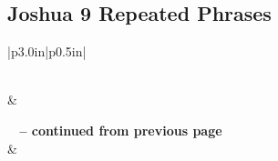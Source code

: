 \subsection{Joshua 9 Repeated Phrases}


\normalsize
 
\begin{center}
\begin{longtable}{|p{3.0in}|p{0.5in}|}
\caption[Joshua 9 Repeated Phrases]{Joshua 9 Repeated Phrases}\label{table:Repeated Phrases Joshua 9} \\
\hline {} &  \\ \hline 
\endfirsthead
 
{{\bfseries \tablename\ \thetable{} -- continued from previous page}} \\  
\hline {} &  \\ \hline 
\endhead
 

\end{longtable}
\end{center}
